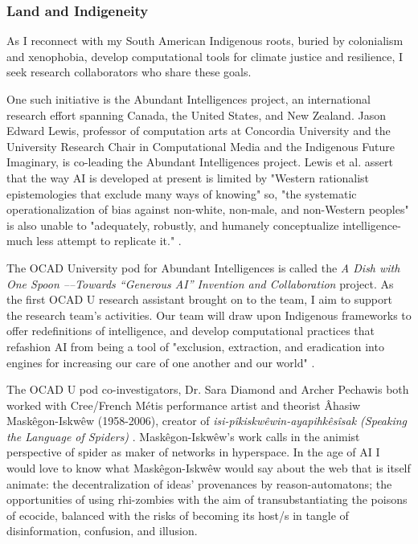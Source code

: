 \subsubsection{Land and Indigeneity}
As I reconnect with my South American Indigenous roots, buried by colonialism and xenophobia, develop computational tools for climate justice and resilience, I seek research collaborators who share these goals. 

One such initiative is the Abundant Intelligences project, an international research effort spanning Canada, the United States, and New Zealand. Jason Edward Lewis, professor of computation arts at Concordia University and the University Research Chair in Computational Media and the Indigenous Future Imaginary, is co-leading the Abundant Intelligences project. Lewis et al. assert that the way AI is developed at present is limited by "Western rationalist epistemologies that exclude many ways of knowing" so, "the systematic operationalization of bias against non-white, non-male, and non-Western peoples" is also unable to "adequately, robustly, and humanely conceptualize intelligence-much less attempt to replicate it." \citep[p. 1-2]{lewis_abundant_2024}.

The OCAD University pod for Abundant Intelligences is called the \textit{A Dish with One Spoon ––Towards “Generous AI” Invention and Collaboration} project. As the first OCAD U research assistant brought on to the team, I aim to support the research team's activities. Our team will draw upon Indigenous frameworks to offer redefinitions of intelligence, and develop computational practices that refashion AI from being a tool of "exclusion, extraction, and eradication into engines for increasing our care of one another and our world" \citep{visual_analytics_lab_abundant_2024}. 

The OCAD U pod co-investigators, Dr. Sara Diamond and Archer Pechawis both worked with Cree/French Métis performance artist and theorist Âhasiw Maskêgon-Iskwêw (1958-2006), creator of \textit{isi-pîkiskwêwin-ayapihkêsîsak (Speaking the Language of Spiders)} \citep{maskegon-iskwew_isi-pikiskwewin-ayapihkesisak_1996}. Maskêgon-Iskwêw's work calls in the animist perspective of spider as maker of networks in hyperspace. In the age of AI I would love to know what Maskêgon-Iskwêw would say about the web that is itself animate: the decentralization of ideas' provenances by reason-automatons; the opportunities of using rhi-zombies with the aim of transubstantiating the poisons of ecocide, balanced with the risks of becoming its host/s in tangle of disinformation, confusion, and illusion.


